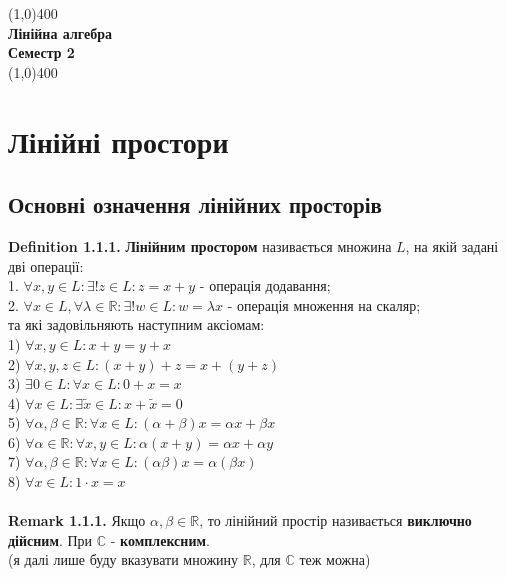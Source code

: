 \documentclass[a4paper, 14pt]{extarticle}
\def\defin#1{\textbf{Definition {#1}}}
\def\rm#1{\textbf{Remark {#1}}}
\def\bigline{\vspace{5mm}\\}
\begin{document}
	\begin{titlepage}
		\begin{center}
		\hfill
		\vfill
		\line(1,0){400}\\
		\large{\textbf{Лінійна алгебра}}\\[1mm]
		{\textbf{Семестр 2}}\\[1mm]
		\line(1,0){400}\\
		\vfill
        	\end{center}
    	\end{titlepage}
\tableofcontents
\newpage
    	
	\section{Лінійні простори}
	\subsection{Основні означення лінійних просторів}
	\defin{1.1.1.} \textbf{Лінійним простором} називається множина $L$, на якій задані дві операції:\\
	1. $\forall x,y \in L: \exists! z \in L: z = x + y$ - операція додавання;\\
	2. $\forall x \in L, \forall \lambda \in \mathbb{R}: \exists! w \in L: w = \lambda x$ - операція множення на скаляр;\\
	та які задовільняють наступним аксіомам:\\
	1) $\forall x,y \in L: x + y = y + x$\\
	2) $\forall x,y,z \in L: (x + y) + z = x + (y + z)$\\
	3) $\exists 0 \in L: \forall x \in L: 0 + x = x$\\
	4) $\forall x \in L: \exists \tilde{x} \in L: x + \tilde{x} = 0$\\
	5) $\forall \alpha, \beta \in \mathbb{R}: \forall x \in L: (\alpha + \beta) x = \alpha x + \beta x$\\
	6) $\forall \alpha \in \mathbb{R}: \forall x,y \in L: \alpha (x+y) = \alpha x + \alpha y$\\
	7) $\forall \alpha, \beta \in \mathbb{R}: \forall x \in L: (\alpha \beta) x = \alpha (\beta x)$\\
	8) $\forall x \in L: 1 \cdot x = x$\\
	\bigline
	\rm{1.1.1.} Якщо $\alpha, \beta \in \mathbb{R}$, то лінійний простір називається  \textbf{виключно дійсним}. При $\mathbb{C}$ - \textbf{комплексним}. \\ (я далі лише буду вказувати множину $\mathbb{R}$, для $\mathbb{C}$ теж можна)\\
\end{document}
